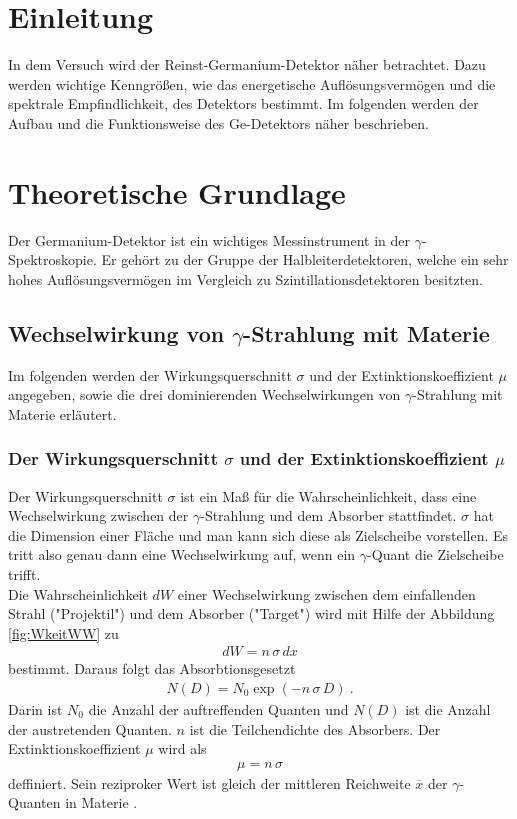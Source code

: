 \section{Einleitung}
In dem Versuch wird der Reinst-Germanium-Detektor näher betrachtet. Dazu werden wichtige Kenngrößen, wie das energetische Auflösungsvermögen und die spektrale Empfindlichkeit, des Detektors bestimmt. Im folgenden werden der Aufbau und die Funktionsweise des Ge-Detektors näher beschrieben.



\section{Theoretische Grundlage}
\label{sec:Theorie}
Der Germanium-Detektor ist ein wichtiges Messinstrument in der $\gamma$-Spektroskopie. Er gehört zu der Gruppe der Halbleiterdetektoren, welche ein sehr hohes Auflösungsvermögen im Vergleich zu Szintillationsdetektoren besitzten.



\subsection{Wechselwirkung von \texorpdfstring{$\gamma$}{}-Strahlung mit Materie}
Im folgenden werden der Wirkungsquerschnitt $\sigma$ und der Extinktionskoeffizient $\mu$ angegeben, sowie die drei dominierenden Wechselwirkungen von $\gamma$-Strahlung mit Materie erläutert.



\subsubsection{Der Wirkungsquerschnitt \texorpdfstring{$\sigma$}{} und der Extinktionskoeffizient \texorpdfstring{$\mu$}{}}
Der Wirkungsquerschnitt $\sigma$ ist ein Maß für die Wahrscheinlichkeit, dass eine Wechselwirkung zwischen der $\gamma$-Strahlung und dem Absorber stattfindet. $\sigma$ hat die Dimension einer Fläche und man kann sich diese als Zielscheibe vorstellen.  Es tritt also genau dann eine Wechselwirkung auf, wenn ein $\gamma$-Quant die Zielscheibe trifft. \\
Die Wahrscheinlichkeit $dW$ einer Wechselwirkung zwischen dem einfallenden Strahl ("Projektil") und dem Absorber ("Target") wird mit Hilfe der Abbildung \eqref{fig:WkeitWW} zu
\begin{align}
	dW = n\,\sigma\,dx
\end{align}
bestimmt. Daraus folgt das Absorbtionsgesetzt
\begin{align}
	N(D) = N_0 \exp(-n\,\sigma\,D) \ .
	\label{eqn:Absorbtion}
\end{align}
Darin ist $N_0$ die Anzahl der auftreffenden Quanten und $N(D)$ ist die Anzahl der austretenden Quanten. $n$ ist die Teilchendichte des Absorbers. Der Extinktionskoeffizient $\mu$ wird als
\begin{align}
	\mu = n\,\sigma
\end{align}
deffiniert. Sein reziproker Wert ist gleich der mittleren Reichweite $\overline{x}$ der $\gamma$-Quanten in Materie \cite[2]{V18}.

